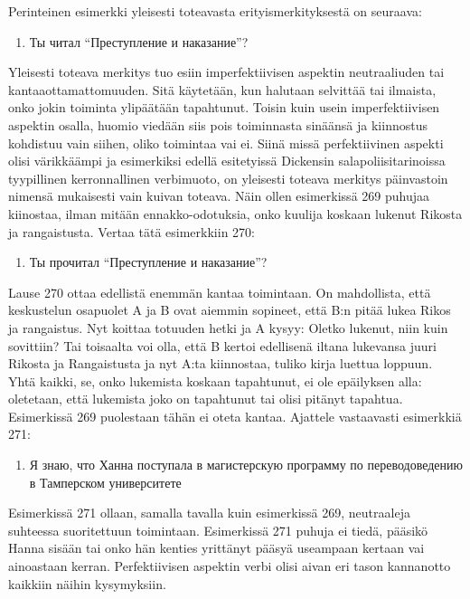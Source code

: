 \documentclass[]{scrartcl}
\providecommand{\tightlist}{%
  \setlength{\itemsep}{0pt}\setlength{\parskip}{0pt}}
\begin{document}
Perinteinen esimerkki yleisesti toteavasta erityismerkityksestä on
seuraava:

\begin{enumerate}
\def\labelenumi{(\arabic{enumi})}
\setcounter{enumi}{268}
\tightlist
\item
  Ты читал ``Преступление и наказание''?
\end{enumerate}

Yleisesti toteava merkitys tuo esiin imperfektiivisen aspektin
neutraaliuden tai kantaaottamattomuuden. Sitä käytetään, kun halutaan
selvittää tai ilmaista, onko jokin toiminta ylipäätään tapahtunut.
Toisin kuin usein imperfektiivisen aspektin osalla, huomio viedään siis
pois toiminnasta sinäänsä ja kiinnostus kohdistuu vain siihen, oliko
toimintaa vai ei. Siinä missä perfektiivinen aspekti olisi värikkäämpi
ja esimerkiksi edellä esitetyissä Dickensin salapoliisitarinoissa
tyypillinen kerronnallinen verbimuoto, on yleisesti toteava merkitys
päinvastoin nimensä mukaisesti vain kuivan toteava. Näin ollen
esimerkissä 269 puhujaa kiinostaa, ilman mitään ennakko-odotuksia, onko
kuulija koskaan lukenut Rikosta ja rangaistusta. Vertaa tätä esimerkkiin
270:

\begin{enumerate}
\def\labelenumi{(\arabic{enumi})}
\setcounter{enumi}{269}
\tightlist
\item
  Ты прочитал ``Преступление и наказание''?
\end{enumerate}

Lause 270 ottaa edellistä enemmän kantaa toimintaan. On mahdollista,
että keskustelun osapuolet A ja B ovat aiemmin sopineet, että B:n pitää
lukea Rikos ja rangaistus. Nyt koittaa totuuden hetki ja A kysyy: Oletko
lukenut, niin kuin sovittiin? Tai toisaalta voi olla, että B kertoi
edellisenä iltana lukevansa juuri Rikosta ja Rangaistusta ja nyt A:ta
kiinnostaa, tuliko kirja luettua loppuun. Yhtä kaikki, se, onko
lukemista koskaan tapahtunut, ei ole epäilyksen alla: oletetaan, että
lukemista joko on tapahtunut tai olisi pitänyt tapahtua. Esimerkissä 269
puolestaan tähän ei oteta kantaa. Ajattele vastaavasti esimerkkiä 271:

\begin{enumerate}
\def\labelenumi{(\arabic{enumi})}
\setcounter{enumi}{270}
\tightlist
\item
  Я знаю, что Ханна поступала в магистерскую программу по
  переводоведению в Тамперском университете
\end{enumerate}

Esimerkissä 271 ollaan, samalla tavalla kuin esimerkissä 269,
neutraaleja suhteessa suoritettuun toimintaan. Esimerkissä 271 puhuja ei
tiedä, pääsikö Hanna sisään tai onko hän kenties yrittänyt pääsyä
useampaan kertaan vai ainoastaan kerran. Perfektiivisen aspektin verbi
olisi aivan eri tason kannanotto kaikkiin näihin kysymyksiin.
\end{document}
